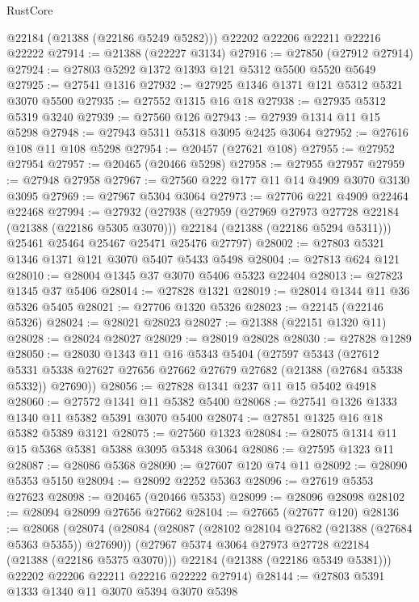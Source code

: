 \begin{lexlean}{RustCore}
\begin{coremodule}
      @22184
      (@21388 (@22186 @5249 @5282)))
    @22202
    @22206
    @22211
    @22216
    @22222
@27914 := @21388 (@22227 @3134)
@27916 := @27850 (@27912 @27914)
@27924 := @27803 @5292 @1372 @1393 @121 @5312 @5500 @5520 @5649
@27925 := @27541 @1316
@27932 := @27925 @1346 @1371 @121 @5312 @5321 @3070 @5500
@27935 := @27552 @1315 @16 @18
@27938 := @27935 @5312 @5319 @3240
@27939 := @27560 @126
@27943 := @27939 @1314 @11 @15 @5298
@27948 := @27943 @5311 @5318 @3095 @2425 @3064
@27952 := @27616 @108 @11 @108 @5298
@27954 := @20457 (@27621 @108)
@27955 := @27952 @27954
@27957 := @20465 (@20466 @5298)
@27958 := @27955 @27957
@27959 := @27948 @27958
@27967 := @27560 @222 @177 @11 @14 @4909 @3070 @3130 @3095
@27969 := @27967 @5304 @3064
@27973 := @27706 @221 @4909 @22464 @22468
@27994 := @27932
    (@27938
      (@27959
        (@27969 @27973 @27728 @22184 (@21388 (@22186 @5305 @3070)))
        @22184
        (@21388 (@22186 @5294 @5311)))
      @25461
      @25464
      @25467
      @25471
      @25476
      @27797)
@28002 := @27803 @5321 @1346 @1371 @121 @3070 @5407 @5433 @5498
@28004 := @27813 @624 @121
@28010 := @28004 @1345 @37 @3070 @5406 @5323 @22404
@28013 := @27823 @1345 @37 @5406
@28014 := @27828 @1321
@28019 := @28014 @1344 @11 @36 @5326 @5405
@28021 := @27706 @1320 @5326
@28023 := @22145 (@22146 @5326)
@28024 := @28021 @28023
@28027 := @21388 (@22151 @1320 @11)
@28028 := @28024 @28027
@28029 := @28019 @28028
@28030 := @27828 @1289
@28050 := @28030
    @1343
    @11
    @16
    @5343
    @5404
    (@27597
      @5343
      (@27612 @5331 @5338 @27627 @27656 @27662 @27679 @27682 (@21388 (@27684 @5338 @5332)) @27690))
@28056 := @27828 @1341 @237 @11 @15 @5402 @4918
@28060 := @27572 @1341 @11 @5382 @5400
@28068 := @27541 @1326 @1333 @1340 @11 @5382 @5391 @3070 @5400
@28074 := @27851 @1325 @16 @18 @5382 @5389 @3121
@28075 := @27560 @1323
@28084 := @28075 @1314 @11 @15 @5368 @5381 @5388 @3095 @5348 @3064
@28086 := @27595 @1323 @11
@28087 := @28086 @5368
@28090 := @27607 @120 @74 @11
@28092 := @28090 @5353 @5150
@28094 := @28092 @2252 @5363
@28096 := @27619 @5353 @27623
@28098 := @20465 (@20466 @5353)
@28099 := @28096 @28098
@28102 := @28094 @28099 @27656 @27662
@28104 := @27665 (@27677 @120)
@28136 := @28068
    (@28074
      (@28084
        (@28087 (@28102 @28104 @27682 (@21388 (@27684 @5363 @5355)) @27690))
        (@27967 @5374 @3064 @27973 @27728 @22184 (@21388 (@22186 @5375 @3070)))
        @22184
        (@21388 (@22186 @5349 @5381)))
      @22202
      @22206
      @22211
      @22216
      @22222
      @27914)
@28144 := @27803 @5391 @1333 @1340 @11 @3070 @5394 @3070 @5398

\end{coremodule}
\end{lexlean}
